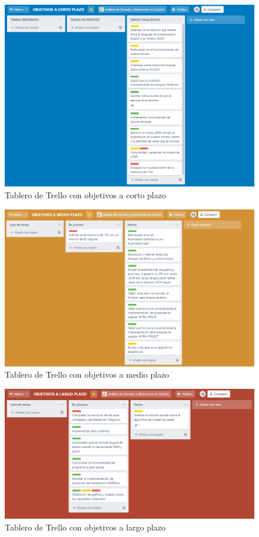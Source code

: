 \documentclass[a4paper, 12pt]{book}
\begin{document}
 \begin{figure}[h]
 	 \centering
    \includegraphics[width=15cm, keepaspectratio]{img/obj_cortoplazo.png}
    \caption{Tablero de Trello con objetivos a corto plazo}
    \label{fig:trello_corto}
 \end{figure}

 \begin{figure}[htb!]
  	 \centering
    \includegraphics[width=17cm, keepaspectratio]{img/obj_medioplazo.png}
    \caption{Tablero de Trello con objetivos a medio plazo}
    \label{fig:trello_medio}
 \end{figure}
 
  \begin{figure}[htb!]
  	 \centering
    \includegraphics[width=17cm, keepaspectratio]{img/obj_largoplazo.png}
    \caption{Tablero de Trello con objetivos a largo plazo}
    \label{fig:trello_largo}
 \end{figure}
 
\end{document}
